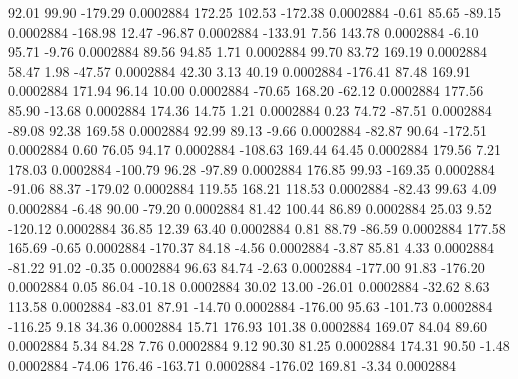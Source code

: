        92.01       99.90     -179.29     0.0002884
      172.25      102.53     -172.38     0.0002884
       -0.61       85.65      -89.15     0.0002884
     -168.98       12.47      -96.87     0.0002884
     -133.91        7.56      143.78     0.0002884
       -6.10       95.71       -9.76     0.0002884
       89.56       94.85        1.71     0.0002884
       99.70       83.72      169.19     0.0002884
       58.47        1.98      -47.57     0.0002884
       42.30        3.13       40.19     0.0002884
     -176.41       87.48      169.91     0.0002884
      171.94       96.14       10.00     0.0002884
      -70.65      168.20      -62.12     0.0002884
      177.56       85.90      -13.68     0.0002884
      174.36       14.75        1.21     0.0002884
        0.23       74.72      -87.51     0.0002884
      -89.08       92.38      169.58     0.0002884
       92.99       89.13       -9.66     0.0002884
      -82.87       90.64     -172.51     0.0002884
        0.60       76.05       94.17     0.0002884
     -108.63      169.44       64.45     0.0002884
      179.56        7.21      178.03     0.0002884
     -100.79       96.28      -97.89     0.0002884
      176.85       99.93     -169.35     0.0002884
      -91.06       88.37     -179.02     0.0002884
      119.55      168.21      118.53     0.0002884
      -82.43       99.63        4.09     0.0002884
       -6.48       90.00      -79.20     0.0002884
       81.42      100.44       86.89     0.0002884
       25.03        9.52     -120.12     0.0002884
       36.85       12.39       63.40     0.0002884
        0.81       88.79      -86.59     0.0002884
      177.58      165.69       -0.65     0.0002884
     -170.37       84.18       -4.56     0.0002884
       -3.87       85.81        4.33     0.0002884
      -81.22       91.02       -0.35     0.0002884
       96.63       84.74       -2.63     0.0002884
     -177.00       91.83     -176.20     0.0002884
        0.05       86.04      -10.18     0.0002884
       30.02       13.00      -26.01     0.0002884
      -32.62        8.63      113.58     0.0002884
      -83.01       87.91      -14.70     0.0002884
     -176.00       95.63     -101.73     0.0002884
     -116.25        9.18       34.36     0.0002884
       15.71      176.93      101.38     0.0002884
      169.07       84.04       89.60     0.0002884
        5.34       84.28        7.76     0.0002884
        9.12       90.30       81.25     0.0002884
      174.31       90.50       -1.48     0.0002884
      -74.06      176.46     -163.71     0.0002884
     -176.02      169.81       -3.34     0.0002884
